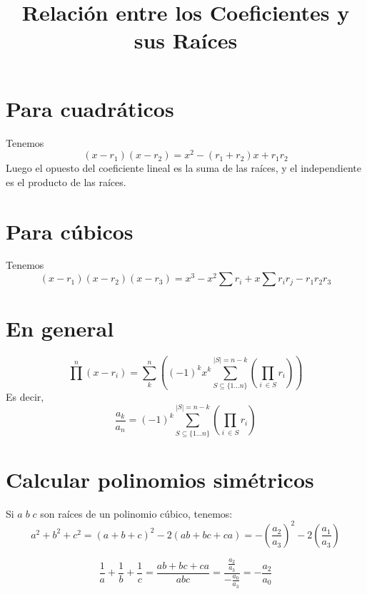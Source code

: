 \documentclass{article}
\title{Relación entre los Coeficientes y sus Raíces}
\date{}
\begin{document}
\maketitle
\section{Para cuadráticos}
Tenemos \[(x - r_1)(x - r_2) = x^2 - (r_1+r_2)x + r_1r_2\]
Luego el opuesto del coeficiente lineal es la suma de las raíces, y el
independiente es el producto de las raíces.

\section{Para cúbicos}
Tenemos \[
	(x - r_1)(x - r_2)(x - r_3) = x^3 - x^2\sum r_i + x\sum r_ir_j -
	r_1r_2r_3
	\]

\section{En general}
\[
	\prod^n (x - r_i) = \sum_k^n \left((-1)^kx^k\sum_{S \subseteq \{1\dots
			n\}}^{|S| = n-k} \left(\prod_{i\
\in S} r_i\right)\right)
\]
Es decir,
\[
	\frac{a_k}{a_n} = (-1)^k \sum_{S \subseteq \{1\dots
			n\}}^{|S| = n-k} \left(\prod_{i\
\in S} r_i\right)
\]
\section{Calcular polinomios simétricos}
Si $a\;b\;c$ son raíces de un polinomio cúbico, tenemos:
\[a^2+b^2+c^2 = (a+b+c)^2 - 2(ab + bc + ca) = -\left(\frac{a_2}{a_3}\right)^2 -
2\left(\frac{a_1}{a_3}\right)\]

\[\frac{1}{a} + \frac{1}{b} + \frac{1}{c} = \frac{ab + bc + ca}{abc} =
	\frac{\frac{a_2}{a_3}}{-\frac{a_0}{a_3}} = -\frac{a_2}{a_0}
\]
\end{document}
